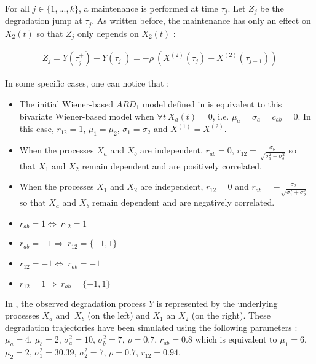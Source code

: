 For all $j \in \{1,...,k\}$, a maintenance is performed at time $\tau_j$. Let $Z_j$ be the degradation jump at $\tau_j$. As written before, the maintenance has only an effect on $X_2(t)$ so that $Z_j$ only depends on $X_2(t)$ :

\begin{align}
Z_j=Y(\tau_j^+)-Y(\tau_j^-)=-\rho\ \left(X^{(2)}(\tau_j)- X^{(2)}(\tau_{j-1})\right)
\label{eq:mainteff}
\end{align}



In some specific cases, one can notice that :

\begin{itemize}

\item The initial Wiener-based $ARD_1$ model defined in \cite{leroy_statistical_2022} is equivalent to this bivariate Wiener-based model when  $\forall t \ X_a(t)=0$, i.e. $\mu_a=\sigma_a=c_{ab}=0$. In this case, $r_{12}=1$, $\mu_1=\mu_2$, $\sigma_1=\sigma_2$ and $X^{(1)}=X^{(2)}$.

\item When the  processes $X_a$ and $X_b$ are independent, $r_{ab}=0$, $r_{12}=\frac{\sigma_b}{\sqrt{\sigma_a^2+\sigma_b^2}}$ so that $X_1$ and $X_2$ remain dependent and are positively correlated.

\item When the processes $X_1$ and $X_2$ are independent, $r_{12}=0$  and $r_{ab}=-\frac{\sigma_2}{\sqrt{\sigma_1^2+\sigma_2^2}}$ so that $X_a$ and $X_b$ remain dependent and are negatively correlated.

\item $r_{ab}=1\Leftrightarrow\ r_{12}=1$
\item $r_{ab}=-1\Rightarrow\ r_{12}=\{-1,1\}$
\item $r_{12}=-1\Leftrightarrow\ r_{ab}=-1$
\item $r_{12}=1\Rightarrow\ r_{ab}=\{-1,1\}$

\end{itemize}



In , the observed degradation process $Y$ is represented by the underlying processes $X_a$ and $\ X_b$ (on the left) and $X_1$ an $X_2$ (on the right). These degradation trajectories have been simulated using the following parameters :  $\mu_a=4$, $\mu_b=2$, $\sigma_a^2=10$, $\sigma_b^2=7$, $\rho=0.7$, $r_{ab}=0.8$ which is equivalent to $\mu_1=6$, $\mu_2=2$, $\sigma_1^2=30.39$, $\sigma_2^2=7$, $\rho=0.7$, $r_{12}=0.94$.

